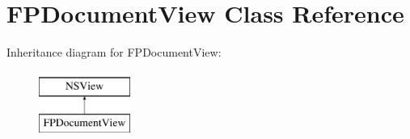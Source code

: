 \hypertarget{interface_f_p_document_view}{}\section{F\+P\+Document\+View Class Reference}
\label{interface_f_p_document_view}
Inheritance diagram for F\+P\+Document\+View\+:\begin{figure}[H]
\begin{center}
\leavevmode
\includegraphics[height=2.000000cm]{interface_f_p_document_view}
\end{center}
\end{figure}

